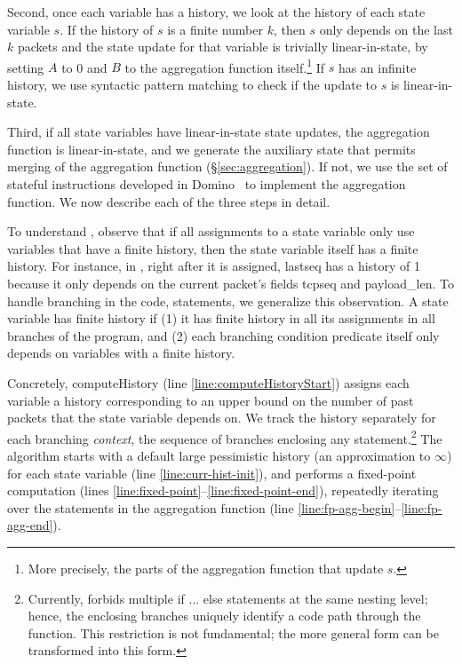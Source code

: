 Second, once each variable has a history, we look at the history of each state
variable $s$. If the history of $s$ is a finite number $k$, then $s$ only
depends on the last $k$ packets and the state update for that variable is
trivially linear-in-state, by setting $A$ to 0 and $B$ to the aggregation
function itself.\footnote{More precisely, the parts of the aggregation function
that update $s$.} If $s$ has an infinite history, we use syntactic pattern
matching to check if the update to $s$ is linear-in-state.

Third, if all state variables have linear-in-state state updates, the
aggregation function is linear-in-state, and we generate the auxiliary state
that permits merging of the aggregation function (\S\ref{sec:aggregation}). If
not, we use the set of stateful instructions developed in Domino~\cite{domino_sigcomm}
to implement the aggregation function. We now describe each of the three steps
in detail.

 To understand , observe that if all
assignments to a state variable only use variables that have a finite history,
then the state variable itself has a finite history. For instance, in
, right after it is assigned, {\ct lastseq} has a history of 1 because it only
depends on the current packet's fields {\ct tcpseq} and {\ct payload\_len}. To
handle branching in the code,  statements, we
generalize this observation. A state variable has finite history if  (1) it 
has finite history in all its assignments in all branches of the program,
and (2) each branching condition {\ct predicate} itself only depends on
variables with a finite history.

Concretely, {\sc computeHistory} (line \ref{line:computeHistoryStart}) assigns each
variable a history corresponding to an upper bound on the number of past
packets that the state variable depends on. We track the history separately for
each branching {\em context}, \ie the sequence of branches enclosing any
statement.\footnote{Currently, \TheSystem forbids multiple {\ctfoot if ...
else} statements at the same nesting level; hence, the enclosing branches
uniquely identify a code path through the function. This restriction is not
fundamental; the more general form can be transformed into this form.} The
algorithm starts with a default large pessimistic history (\ie an approximation
to $\infty$) for each state variable (line \ref{line:curr-hist-init}), and
performs a fixed-point computation (lines
\ref{line:fixed-point}--\ref{line:fixed-point-end}), repeatedly iterating over
the statements in the aggregation function (line
\ref{line:fp-agg-begin}--\ref{line:fp-agg-end}).

